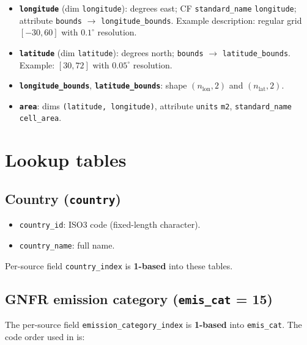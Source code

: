 \documentclass[11pt,a4paper]{article}
\begin{document}
\begin{itemize}
  \item \textbf{\texttt{longitude}} (dim \texttt{longitude}): degrees east; CF \texttt{standard\_name} \texttt{longitude}; attribute \texttt{bounds} $\rightarrow$ \texttt{longitude\_bounds}. Example description: regular grid $[-30,60]$ with $0.1^\circ$ resolution.
  \item \textbf{\texttt{latitude}} (dim \texttt{latitude}): degrees north; \texttt{bounds} $\rightarrow$ \texttt{latitude\_bounds}. Example: $[30,72]$ with $0.05^\circ$ resolution.
  \item \textbf{\texttt{longitude\_bounds}}, \textbf{\texttt{latitude\_bounds}}: shape $(n_{\mathrm{lon}},2)$ and $(n_{\mathrm{lat}},2)$.
  \item \textbf{\texttt{area}}: dims \texttt{(latitude, longitude)}, attribute \texttt{units} \texttt{m2}, \texttt{standard\_name} \texttt{cell\_area}.
\end{itemize}

\section{Lookup tables}

\subsection{Country (\texttt{country})}

\begin{itemize}
  \item \texttt{country\_id}: ISO3 code (fixed-length character).
  \item \texttt{country\_name}: full name.
\end{itemize}
Per-source field \texttt{country\_index} is \textbf{1-based} into these tables.

\subsection{GNFR emission category (\texttt{emis\_cat} = 15)}

The per-source field \texttt{emission\_category\_index} is \textbf{1-based} into \texttt{emis\_cat}. The code order used in  is:
\end{document}

